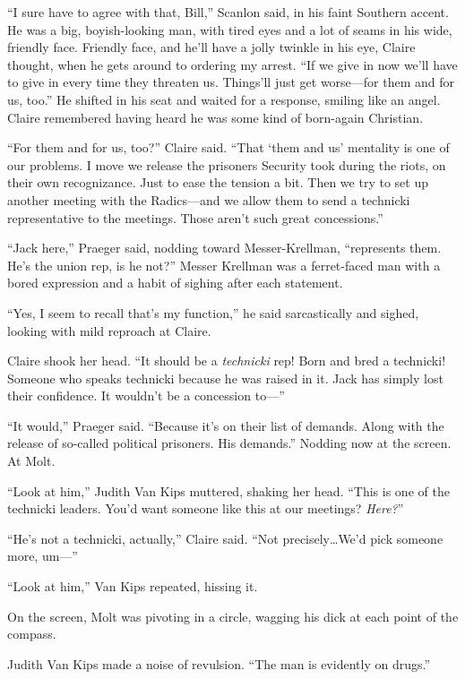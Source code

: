 ``I sure have to agree with that, Bill,'' Scanlon said, in his faint Southern accent. He was a big, boyish-looking man, with tired eyes and a lot of seams in his wide, friendly face. Friendly face, and he'll have a jolly twinkle in his eye, Claire thought, when he gets around to ordering my arrest. ``If we give in now we'll have to give in every time they threaten us. Things'll just get worse---for them and for us, too.'' He shifted in his seat and waited for a response, smiling like an angel. Claire remembered having heard he was some kind of born-again Christian.

``For them and for us, too?'' Claire said. ``That ‘them and us' mentality is one of our problems. I move we release the prisoners Security took during the riots, on their own recognizance. Just to ease the tension a bit. Then we try to set up another meeting with the Radics---and we allow them to send a technicki representative to the meetings. Those aren't such great concessions.''

``Jack here,'' Praeger said, nodding toward Messer-Krellman, ``represents them. He's the union rep, is he not?'' Messer Krellman was a ferret-faced man with a bored expression and a habit of sighing after each statement.

``Yes, I seem to recall that's my function,'' he said sarcastically and sighed, looking with mild reproach at Claire.

Claire shook her head. ``It should be a \textit{technicki} rep! Born and bred a technicki! Someone who speaks technicki because he was raised in it. Jack has simply lost their confidence. It wouldn't be a concession to---''

``It would,'' Praeger said. ``Because it's on their list of demands. Along with the release of so-called political prisoners. His demands.'' Nodding now at the screen. At Molt.

``Look at him,'' Judith Van Kips muttered, shaking her head. ``This is one of the technicki leaders. You'd want someone like this at our meetings? \textit{Here?}''

``He's not a technicki, actually,'' Claire said. ``Not precisely\ldots We'd pick someone more, um---''

``Look at him,'' Van Kips repeated, hissing it.

On the screen, Molt was pivoting in a circle, wagging his dick at each point of the compass.

Judith Van Kips made a noise of revulsion. ``The man is evidently on drugs.''

